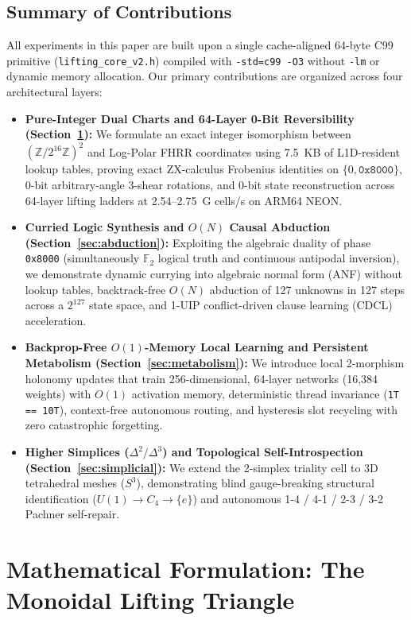 \documentclass[11pt, a4paper]{article}
\begin{document}
\subsection{Summary of Contributions}
All experiments in this paper are built upon a single cache-aligned 64-byte C99 primitive (\texttt{lifting\_core\_v2.h}) compiled with \texttt{-std=c99 -O3} without \texttt{-lm} or dynamic memory allocation. Our primary contributions are organized across four architectural layers:
\begin{itemize}
    \item \textbf{Pure-Integer Dual Charts and 64-Layer 0-Bit Reversibility (Section~\ref{sec:formulation}):} We formulate an exact integer isomorphism between $(\mathbb{Z}/2^{16}\mathbb{Z})^2$ and Log-Polar FHRR coordinates using 7.5~KB of L1D-resident lookup tables, proving exact ZX-calculus Frobenius identities on $\{0, \texttt{0x8000}\}$, 0-bit arbitrary-angle 3-shear rotations, and 0-bit state reconstruction across 64-layer lifting ladders at 2.54--2.75~G cells/s on ARM64 NEON.
    \item \textbf{Curried Logic Synthesis and $O(N)$ Causal Abduction (Section~\ref{sec:abduction}):} Exploiting the algebraic duality of phase \texttt{0x8000} (simultaneously $\mathbb{F}_2$ logical truth and continuous antipodal inversion), we demonstrate dynamic currying into algebraic normal form (ANF) without lookup tables, backtrack-free $O(N)$ abduction of 127 unknowns in 127 steps across a $2^{127}$ state space, and 1-UIP conflict-driven clause learning (CDCL) acceleration.
    \item \textbf{Backprop-Free $O(1)$-Memory Local Learning and Persistent Metabolism (Section~\ref{sec:metabolism}):} We introduce local 2-morphism holonomy updates that train 256-dimensional, 64-layer networks (16,384 weights) with $O(1)$ activation memory, deterministic thread invariance (\texttt{1T == 10T}), context-free autonomous routing, and hysteresis slot recycling with zero catastrophic forgetting.
    \item \textbf{Higher Simplices ($\Delta^2 / \Delta^3$) and Topological Self-Introspection (Section~\ref{sec:simplicial}):} We extend the 2-simplex triality cell to 3D tetrahedral meshes ($S^3$), demonstrating blind gauge-breaking structural identification ($U(1) \to C_4 \to \{e\}$) and autonomous 1-4 / 4-1 / 2-3 / 3-2 Pachner self-repair.
\end{itemize}

\section{Mathematical Formulation: The Monoidal Lifting Triangle}
\label{sec:formulation}
\end{document}
